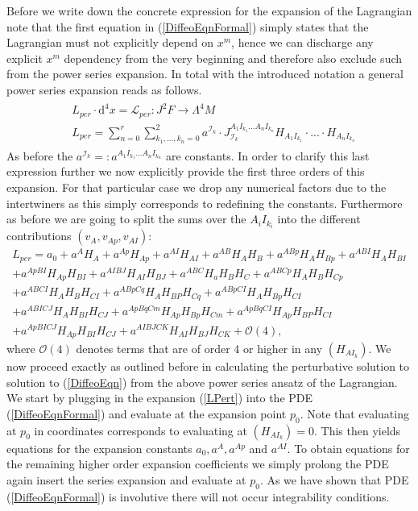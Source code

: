 \documentclass[a4paper,12pt, DIV=14, BCOR=5mm, twoside, headsepline]{scrbook}
\begin{document}
Before we write down the concrete expression for the expansion of the Lagrangian note that the first equation in (\ref{DiffeoEqnFormal}) simply states that the Lagrangian must not explicitly depend on $x^m$, hence we can discharge any explicit $x^m$ dependency from the very beginning and therefore also exclude such from the power series expansion. In total with the introduced notation a general power series expansion reads as follows. 
\begin{align} \label{generalPowerSL}
    \begin{aligned}
    &L_{per} \cdot  \mathrm{d}^4x = \mathcal{L}_{per} : J^2F \longrightarrow \Lambda^4M \\
    &L_{per} = \sum_{n=0}^r \sum_{k_1,...,k_n = 0}^2 a^{\mathcal{I}_k} \cdot J_{\mathcal{I}_k}^{A_1I_{k_1}...A_nI_{k_n}} H_{A_1I_{k_1}} \cdot ... \cdot H_{A_nI_{k_n}}
    \end{aligned}
\end{align}
%
%
As before the $a^{\mathcal{I}_k} =: a^{A_1I_{k_1}...A_nI_{k_n}}$ are constants. 
In order to clarify this last expression further we now explicitly provide the first three orders of this expansion. For that particular case we drop any numerical factors due to the intertwiners as this simply corresponds to redefining the constants. Furthermore as before we are going to split the sums over the ${A_iI_{k_i}}$ into the different contributions $(v_A,v_{Ap},v_{AI})$:
\begin{multline}\label{LPert}
    L_{per} = a_0 + a^A H_A + a^{Ap} H_{Ap} + a^{AI}H_{AI} + a^{AB} H_{A}H_{B} + a^{ABp}H_A H_{Bp} + a^{ABI} H_{A} H_{BI}\\
    +a^{ApBI}H_{Ap} H_{BI} + a^{AIBJ} H_{AI}H_{BJ} + a^{ABC} H_a H_B H_C 
    + a^{ABCp} H_A H_B H_{Cp} \\
    +a^{ABCI} H_A H_B H_{CI} + a^{ABpCq} H_{A}H_{BP}H_{Cq} + a^{ABpCI} H_A H_{Bp} H_{CI}\\
    + a^{ABICJ} H_A H_{BI}H_{CJ} 
    + a^{ApBqCm} H_{Ap} H_{Bp} H_{Cm}+ a^{ApBq CI} H_{Ap} H_{BP} H_{CI}\\
    + a^{Ap BI CJ} H_{Ap} H_{BI} H_{CJ} + a^{AIBJCK} H_{AI} H_{BJ} H_{CK} + \mathcal{O}(4),
\end{multline}
where $\mathcal{O}(4)$ denotes terms that are of order 4 or higher in any $(H_{AI_k})$. We now proceed exactly as outlined before in calculating the perturbative solution to solution to (\ref{DiffeoEqn}) from the above power series ansatz of the Lagrangian. We start by plugging in the expansion (\ref{LPert}) into the PDE (\ref{DiffeoEqnFormal}) and evaluate at the expansion point $p_0$. Note that evaluating at $p_0$ in coordinates corresponds to evaluating at $(H_{AI_k})=0$. This then yields equations for the expansion constants $a_0, a^A, a^{Ap}$ and $a^{AI}$. To obtain equations for the remaining higher order expansion coefficients we simply prolong the PDE again insert the series expansion and evaluate at $p_0$. As we have shown that PDE (\ref{DiffeoEqnFormal}) is involutive there will not occur integrability conditions.\\
\end{document}
